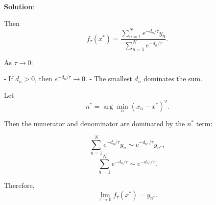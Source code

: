 \documentclass[submit]{harvardml}
\newenvironment{solution}{
    \vspace{2mm}
    \color{blue}\noindent\textbf{Solution}:
}{}
\begin{document}
\begin{solution}
\begin{enumerate}
\begin{enumerate}
Then
\[
f_\tau(x^*)
=
\frac{\sum_{n=1}^{N} e^{-d_n/\tau} y_n}
{\sum_{n=1}^{N} e^{-d_n/\tau}}.
\]

As $\tau \to 0$:

- If $d_n > 0$, then $e^{-d_n/\tau} \to 0$.
- The smallest $d_n$ dominates the sum.

Let
\[
n^* = \arg\min_n (x_n - x^*)^2.
\]

Then the numerator and denominator are dominated by the $n^*$ term:

\[
\sum_{n=1}^{N} e^{-d_n/\tau} y_n 
\sim e^{-d_{n^*}/\tau} y_{n^*},
\]
\[
\sum_{n=1}^{N} e^{-d_n/\tau}
\sim e^{-d_{n^*}/\tau}.
\]

Therefore,
\[
\lim_{\tau \to 0} f_\tau(x^*)
=
y_{n^*}.
\]

        \end{enumerate}
	\end{enumerate}
\end{solution}

\newpage
\end{document}
